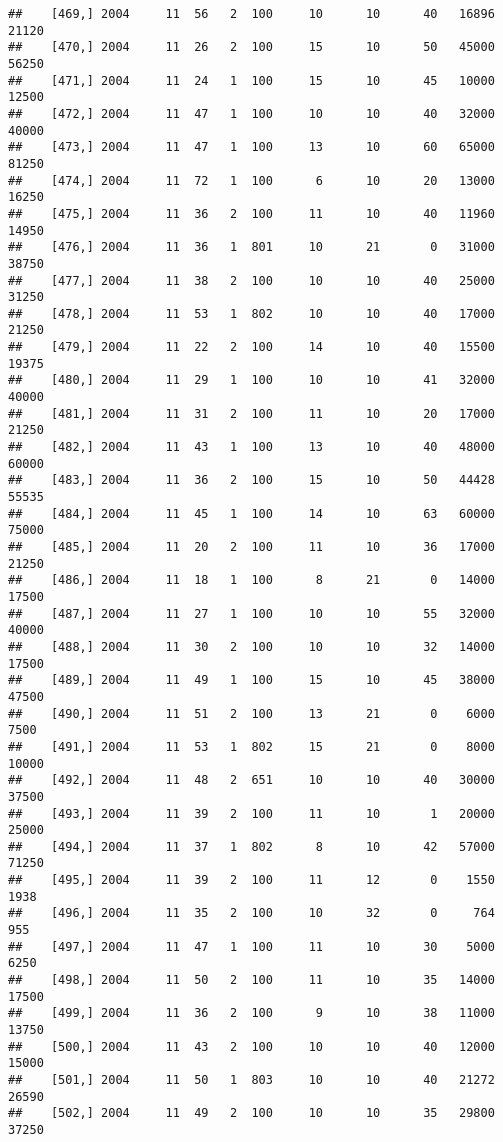 \documentclass{article}\usepackage[]{graphicx}\usepackage[]{color}
\makeatletter
\newenvironment{kframe}{%
 \def\at@end@of@kframe{}%
 \ifinner\ifhmode%
  \def\at@end@of@kframe{\end{minipage}}%
  \begin{minipage}{\columnwidth}%
 \fi\fi%
 \def\FrameCommand##1{\hskip\@totalleftmargin \hskip-\fboxsep
 \colorbox{shadecolor}{##1}\hskip-\fboxsep
     \hskip-\linewidth \hskip-\@totalleftmargin \hskip\columnwidth}%
 \MakeFramed {\advance\hsize-\width
   \@totalleftmargin\z@ \linewidth\hsize
   \@setminipage}}%
 {\par\unskip\endMakeFramed%
 \at@end@of@kframe}
\newenvironment{knitrout}{}{} %
\makeatother
\begin{document}
\begin{knitrout}
\begin{kframe}
\begin{verbatim}
##    [469,] 2004     11  56   2  100     10      10      40   16896   21120
##    [470,] 2004     11  26   2  100     15      10      50   45000   56250
##    [471,] 2004     11  24   1  100     15      10      45   10000   12500
##    [472,] 2004     11  47   1  100     10      10      40   32000   40000
##    [473,] 2004     11  47   1  100     13      10      60   65000   81250
##    [474,] 2004     11  72   1  100      6      10      20   13000   16250
##    [475,] 2004     11  36   2  100     11      10      40   11960   14950
##    [476,] 2004     11  36   1  801     10      21       0   31000   38750
##    [477,] 2004     11  38   2  100     10      10      40   25000   31250
##    [478,] 2004     11  53   1  802     10      10      40   17000   21250
##    [479,] 2004     11  22   2  100     14      10      40   15500   19375
##    [480,] 2004     11  29   1  100     10      10      41   32000   40000
##    [481,] 2004     11  31   2  100     11      10      20   17000   21250
##    [482,] 2004     11  43   1  100     13      10      40   48000   60000
##    [483,] 2004     11  36   2  100     15      10      50   44428   55535
##    [484,] 2004     11  45   1  100     14      10      63   60000   75000
##    [485,] 2004     11  20   2  100     11      10      36   17000   21250
##    [486,] 2004     11  18   1  100      8      21       0   14000   17500
##    [487,] 2004     11  27   1  100     10      10      55   32000   40000
##    [488,] 2004     11  30   2  100     10      10      32   14000   17500
##    [489,] 2004     11  49   1  100     15      10      45   38000   47500
##    [490,] 2004     11  51   2  100     13      21       0    6000    7500
##    [491,] 2004     11  53   1  802     15      21       0    8000   10000
##    [492,] 2004     11  48   2  651     10      10      40   30000   37500
##    [493,] 2004     11  39   2  100     11      10       1   20000   25000
##    [494,] 2004     11  37   1  802      8      10      42   57000   71250
##    [495,] 2004     11  39   2  100     11      12       0    1550    1938
##    [496,] 2004     11  35   2  100     10      32       0     764     955
##    [497,] 2004     11  47   1  100     11      10      30    5000    6250
##    [498,] 2004     11  50   2  100     11      10      35   14000   17500
##    [499,] 2004     11  36   2  100      9      10      38   11000   13750
##    [500,] 2004     11  43   2  100     10      10      40   12000   15000
##    [501,] 2004     11  50   1  803     10      10      40   21272   26590
##    [502,] 2004     11  49   2  100     10      10      35   29800   37250

\end{verbatim}
\end{kframe}
\end{knitrout}
\end{document}
